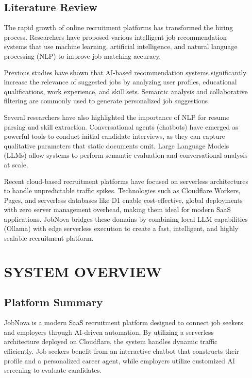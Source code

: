 \documentclass[12pt,a4paper]{report}
\begin{document}
\section{Literature Review}

The rapid growth of online recruitment platforms has transformed the hiring process. Researchers have proposed various intelligent job recommendation systems that use machine learning, artificial intelligence, and natural language processing (NLP) to improve job matching accuracy.

Previous studies have shown that AI-based recommendation systems significantly increase the relevance of suggested jobs by analyzing user profiles, educational qualifications, work experience, and skill sets. Semantic analysis and collaborative filtering are commonly used to generate personalized job suggestions.

Several researchers have also highlighted the importance of NLP for resume parsing and skill extraction. Conversational agents (chatbots) have emerged as powerful tools to conduct initial candidate interviews, as they can capture qualitative parameters that static documents omit. Large Language Models (LLMs) allow systems to perform semantic evaluation and conversational analysis at scale.

Recent cloud-based recruitment platforms have focused on serverless architectures to handle unpredictable traffic spikes. Technologies such as Cloudflare Workers, Pages, and serverless databases like D1 enable cost-effective, global deployments with zero server management overhead, making them ideal for modern SaaS applications. JobNova bridges these domains by combining local LLM capabilities (Ollama) with edge serverless execution to create a fast, intelligent, and highly scalable recruitment platform.


\chapter{SYSTEM OVERVIEW}

\section{Platform Summary}

JobNova is a modern SaaS recruitment platform designed to connect job seekers and employers through AI-driven automation. By utilizing a serverless architecture deployed on Cloudflare, the system handles dynamic traffic efficiently. Job seekers benefit from an interactive chatbot that constructs their profile and a personalized career agent, while employers utilize customized AI screening to evaluate candidates.
\end{document}

